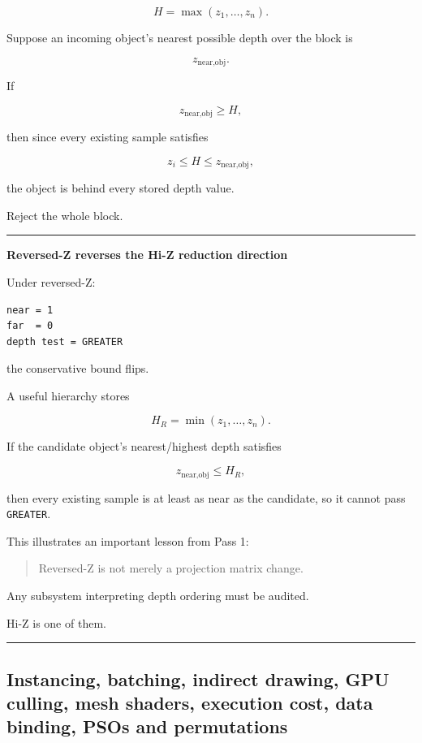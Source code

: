 \[
H=\max(z_1,\dots,z_n).
\]

Suppose an incoming object's nearest possible depth over the block is

\[
z_{\text{near,obj}}.
\]

If

\[
z_{\text{near,obj}}\ge H,
\]

then since every existing sample satisfies

\[
z_i\le H\le z_{\text{near,obj}},
\]

the object is behind every stored depth value.

Reject the whole block.

\begin{center}\rule{0.5\linewidth}{0.5pt}\end{center}

\textbf{Reversed-Z reverses the Hi-Z reduction direction}

Under reversed-Z:

\begin{verbatim}
near = 1
far  = 0
depth test = GREATER
\end{verbatim}

the conservative bound flips.

A useful hierarchy stores

\[
H_R=\min(z_1,\dots,z_n).
\]

If the candidate object's nearest/highest depth satisfies

\[
z_{\text{near,obj}}\le H_R,
\]

then every existing sample is at least as near as the candidate, so it cannot pass \texttt{GREATER}.

This illustrates an important lesson from Pass 1:

\begin{quote}
Reversed-Z is not merely a projection matrix change.
\end{quote}

Any subsystem interpreting depth ordering must be audited.

Hi-Z is one of them.

\begin{center}\rule{0.5\linewidth}{0.5pt}\end{center}

\subsection{Instancing, batching, indirect drawing, GPU culling, mesh shaders, execution cost, data binding, PSOs and permutations}\label{03-visual-computing-i-ch014-instancing-batching-indirect-drawing-gpu-culling-mesh-shaders-execution-cost-data-binding-psos-and-permutations}

